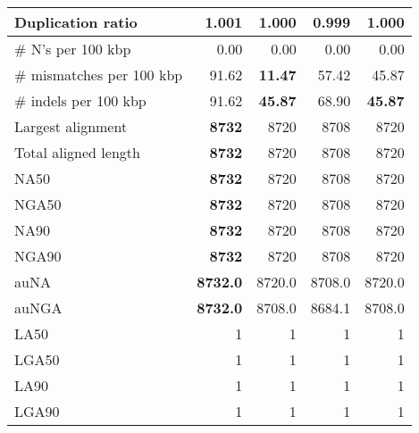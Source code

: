 \documentclass[12pt,a4paper]{article}
\begin{document}
\begin{table}[ht]
\begin{center}
\begin{tabular}{|l*{4}{|r}|}
Duplication ratio & 1.001 & 1.000 & {\bf 0.999} & 1.000 \\ \hline
\# N's per 100 kbp & 0.00 & 0.00 & 0.00 & 0.00 \\ \hline
\# mismatches per 100 kbp & 91.62 & {\bf 11.47} & 57.42 & 45.87 \\ \hline
\# indels per 100 kbp & 91.62 & {\bf 45.87} & 68.90 & {\bf 45.87} \\ \hline
Largest alignment & {\bf 8732} & 8720 & 8708 & 8720 \\ \hline
Total aligned length & {\bf 8732} & 8720 & 8708 & 8720 \\ \hline
NA50 & {\bf 8732} & 8720 & 8708 & 8720 \\ \hline
NGA50 & {\bf 8732} & 8720 & 8708 & 8720 \\ \hline
NA90 & {\bf 8732} & 8720 & 8708 & 8720 \\ \hline
NGA90 & {\bf 8732} & 8720 & 8708 & 8720 \\ \hline
auNA & {\bf 8732.0} & 8720.0 & 8708.0 & 8720.0 \\ \hline
auNGA & {\bf 8732.0} & 8708.0 & 8684.1 & 8708.0 \\ \hline
LA50 & 1 & 1 & 1 & 1 \\ \hline
LGA50 & 1 & 1 & 1 & 1 \\ \hline
LA90 & 1 & 1 & 1 & 1 \\ \hline
LGA90 & 1 & 1 & 1 & 1 \\ \hline
\end{tabular}
\end{center}
\end{table}
\end{document}
